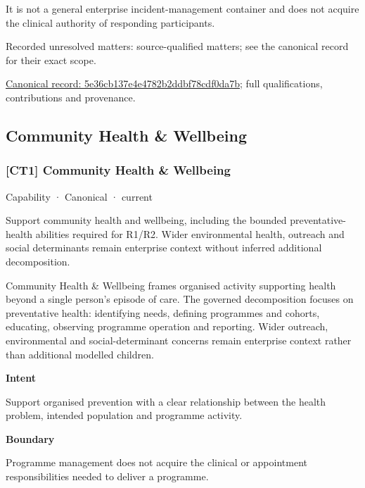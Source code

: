 It is not a general enterprise incident-management container and does not acquire the clinical authority of responding participants.


{\small Recorded unresolved matters: source-qualified matters; see the canonical record for their exact scope.}\par
{\footnotesize \href{../../../../continuum/strategy/capability/5e36cb137e4e4782b2ddbf78cdf0da7b.md}{Canonical record: 5e36cb137e4e4782b2ddbf78cdf0da7b}; full qualifications, contributions and provenance.}\par
\subsection{Community Health \& Wellbeing}

\subsubsection{[CT1] Community Health \& Wellbeing}

\label{element:b326b4aaf02a41a986ed22d184cbc152}
{\small Capability · Canonical · current}\par

Support community health and wellbeing, including the bounded preventative-health abilities required for R1/R2. Wider environmental health, outreach and social determinants remain enterprise context without inferred additional decomposition.



Community Health \& Wellbeing frames organised activity supporting health beyond a single person's episode of care. The governed decomposition focuses on preventative health: identifying needs, defining programmes and cohorts, educating, observing programme operation and reporting. Wider outreach, environmental and social-determinant concerns remain enterprise context rather than additional modelled children.



\textbf{Intent}



Support organised prevention with a clear relationship between the health problem, intended population and programme activity.



\textbf{Boundary}



Programme management does not acquire the clinical or appointment responsibilities needed to deliver a programme.




